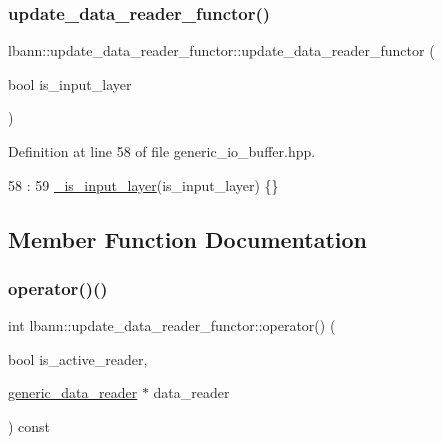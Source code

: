 \subsubsection{\texorpdfstring{update\+\_\+data\+\_\+reader\+\_\+functor()}{update\_data\_reader\_functor()}}
{\footnotesize\ttfamily lbann\+::update\+\_\+data\+\_\+reader\+\_\+functor\+::update\+\_\+data\+\_\+reader\+\_\+functor (\begin{DoxyParamCaption}\item[{bool}]{is\+\_\+input\+\_\+layer }\end{DoxyParamCaption})\hspace{0.3cm}{\ttfamily [inline]}}



Definition at line 58 of file generic\+\_\+io\+\_\+buffer.\+hpp.


\begin{DoxyCode}
58                                                    :
59     \hyperlink{classlbann_1_1update__data__reader__functor_a5a8bc619956adeeeb988e2e6eaa95ca4}{\_is\_input\_layer}(is\_input\_layer) \{\}
\end{DoxyCode}


\subsection{Member Function Documentation}
\mbox{\label{classlbann_1_1update__data__reader__functor_af7bb363237370dd7b84364fea740bcdf}} 
\subsubsection{\texorpdfstring{operator()()}{operator()()}}
{\footnotesize\ttfamily int lbann\+::update\+\_\+data\+\_\+reader\+\_\+functor\+::operator() (\begin{DoxyParamCaption}\item[{bool}]{is\+\_\+active\+\_\+reader,  }\item[{\hyperlink{classlbann_1_1generic__data__reader}{generic\+\_\+data\+\_\+reader} $\ast$}]{data\+\_\+reader }\end{DoxyParamCaption}) const\hspace{0.3cm}{\ttfamily [inline]}}



